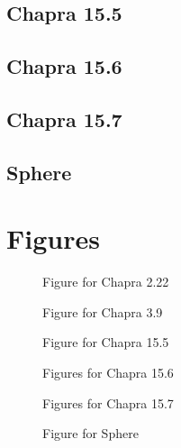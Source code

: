 \documentclass{article}
\begin{document}
\subsection{Chapra 15.5}
\pagebreak

\subsection{Chapra 15.6}
\pagebreak

\subsection{Chapra 15.7}
\pagebreak

\subsection{Sphere}

\clearpage %

\section{Figures}

\begin{figure}[ht!]
\begin{center}
\caption{Figure for Chapra 2.22}
\end{center}
\end{figure}

\begin{figure}[ht!]
\begin{center}
\caption{Figure for Chapra 3.9}
\end{center}
\end{figure}

\begin{figure}[ht!]
\begin{center}
\caption{Figure for Chapra 15.5}
\end{center}
\end{figure}

\begin{figure}[ht!]
\begin{center}
\caption{Figures for Chapra 15.6}
\end{center}
\end{figure}

\begin{figure}[ht!]
\begin{center}
\caption{Figures for Chapra 15.7}
\end{center}
\end{figure}

\begin{figure}[ht!]
\begin{center}
\caption{Figure for Sphere}
\end{center}
\end{figure}
\end{document}
